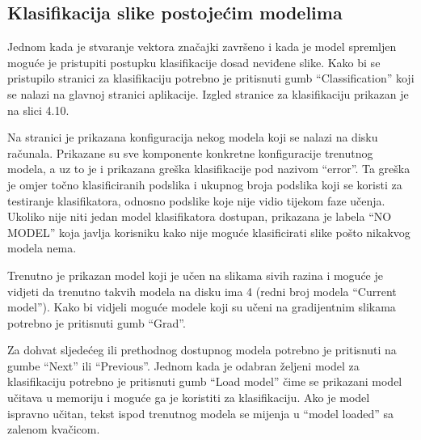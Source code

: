 \documentclass[times, utf8, zavrsni, numeric]{fer}
\begin{document}
\subsection{Klasifikacija slike postojećim modelima}

Jednom kada je stvaranje vektora značajki završeno i kada je model spremljen 
moguće je pristupiti postupku klasifikacije dosad neviđene slike. Kako bi se pristupilo 
stranici za klasifikaciju potrebno je 
pritisnuti gumb \enquote{Classification} koji se nalazi na glavnoj 
stranici aplikacije. Izgled stranice za klasifikaciju prikazan je na 
slici 4.10.

\bigbreak 

Na stranici je prikazana konfiguracija nekog modela koji se nalazi na 
disku računala. Prikazane su sve komponente konkretne konfiguracije
trenutnog modela, a uz to je i prikazana greška klasifikacije pod
nazivom \enquote{error}. Ta greška je omjer točno klasificiranih
podslika i ukupnog broja podslika koji se koristi za testiranje klasifikatora,
odnosno podslike koje nije vidio tijekom faze učenja. Ukoliko nije niti 
jedan model klasifikatora dostupan, prikazana je labela \enquote{NO MODEL}
koja javlja korisniku kako nije moguće klasificirati slike pošto nikakvog modela
nema.

\bigbreak

Trenutno je prikazan model koji je učen na slikama sivih razina i moguće
je vidjeti da trenutno takvih modela na disku ima 4 (redni broj modela
\enquote{Current model}). Kako bi vidjeli moguće modele koji su učeni na
gradijentnim slikama potrebno je pritisnuti gumb \enquote{Grad}.

\bigbreak

Za dohvat sljedećeg ili prethodnog dostupnog modela potrebno je pritisnuti na 
gumbe \enquote{Next} ili \enquote{Previous}. Jednom kada je odabran željeni
model za klasifikaciju potrebno je pritisnuti gumb \enquote{Load model} čime
se prikazani model učitava u memoriju i moguće ga je koristiti za klasifikaciju.
Ako je model ispravno učitan, tekst ispod trenutnog modela se mijenja
u \enquote{model loaded} sa zalenom kvačicom.

\bigbreak 
\end{document}
